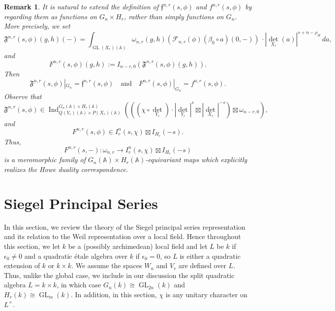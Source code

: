 \documentclass[10pt]{amsart}
\theoremstyle{plain}
\newtheorem{Rmk}[equation]{Remark}
\numberwithin{equation}{section}
\begin{document}
\begin{Rmk}\label{rm_section}
 It is natural to extend the definition of
 $\mathfrak{f}^{n,r}(s,\phi)$ and $f^{n,r}(s,\phi)$ by
 regarding them as  functions on $G_n \times H_r$, rather than simply
 functions on $G_n$.  More precisely, we set
 \[  \mathfrak{F}^{n,r}(s,\phi)(g,h)(-) = 
  \int_{{\operatorname{GL}}(X_r)({\mathbb{A}})} \omega_{n,r}(g,h)(\mathcal{F}_{n,r}(\phi)
 ( \beta_0 \circ a)(0 , -) )\,\cdot   |{\det}_{X_r}(a)|^{s + n -
   \rho_H} \, da, 
\]
 and
 \[  F^{n,r}(s,\phi)(g,h)  :=  I_{n-r,0}(\mathfrak{F}^{n,r}(s,\phi)(g,h)). \]
Then
\[   \mathfrak{F}^{n,r}(s,\phi)|_{G_n} =  \mathfrak{f}^{n,r}(s,\phi) \quad \text{and} \quad
 F^{n,r}(s,\phi)|_{G_n} =  f^{n,r}(s,\phi).  \]
 Observe that
 \[  \mathfrak{F}^{n,r}(s,\phi) \in {\operatorname{Ind}}^{G_n({\mathbb{A}}) \times H_r({\mathbb{A}})}_{Q(Y_r)({\mathbb{A}}) \times P(X_r)({\mathbb{A}})}  
\left( ((\chi \circ {\det}_{Y_r})\cdot  |{\det}_{Y_r}|^s \boxtimes
  |{\det}_{X_r}|^{-s})  \boxtimes \omega_{n-r,0} \right), \]
 and
 \[ F^{n,r}(s,\phi)  \in    I^n_r(s,\chi) \boxtimes I_{H_r}(-s). \]
 Thus, 
 \[  F^{n,r}(s,-) :  \omega_{n,r} \longrightarrow I^n_r(s,\chi) \boxtimes I_{H_r}(-s) \]
 is a meromorphic family of $G_n({\mathbb{A}}) \times H_r({\mathbb{A}})$-equivariant maps
 which explicitly realizes the  Howe duality correspondence. 
\end{Rmk}
 \vskip 15pt
 
 
 
 
 
 \section{\bf Siegel Principal Series} \label{S:siegel}
 
 In this section, we  review the theory of the Siegel principal series
 representation and its relation to the Weil representation over a
 local field. Hence throughout this section, we let $k$ be a
 (possibly archimedean) local field and let $L$ be $k$ if
 $\epsilon_0\neq 0$ and a quadratic \'{e}tale algebra over $k$ if
 $\epsilon_0=0$, so $L$
 is either a quadratic extension of $k$ or $k\times k$. We assume the
 spaces $W_n$ and $V_r$ are defined over $L$. Thus, unlike
  the global case, we include in our discussion 
  the split quadratic algebra $L=k\times k$, in which case 
 $G_n(k) \cong {\operatorname{GL}}_{2n}(k)$ and $H_r(k)\cong {\operatorname{GL}}_m(k)$.  In addition,  in
 this section, $\chi$ is any unitary character on $L^\times$.
\vskip 5pt
\end{document}
